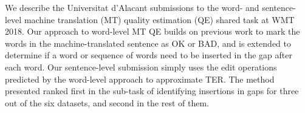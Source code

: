 We describe the Universitat d'Alacant submissions to the word- and sentence-level machine translation (MT) quality estimation (QE) shared task at WMT 2018. Our approach to word-level MT QE builds on previous work to mark the words in the machine-translated sentence as OK or BAD, and is extended to determine if a word or sequence of words need to be inserted in the gap after each word. Our sentence-level submission simply uses the edit operations predicted by the word-level approach to approximate TER. The method presented ranked first in the sub-task of identifying insertions in gaps for three out of the six datasets, and second in the rest of them.
